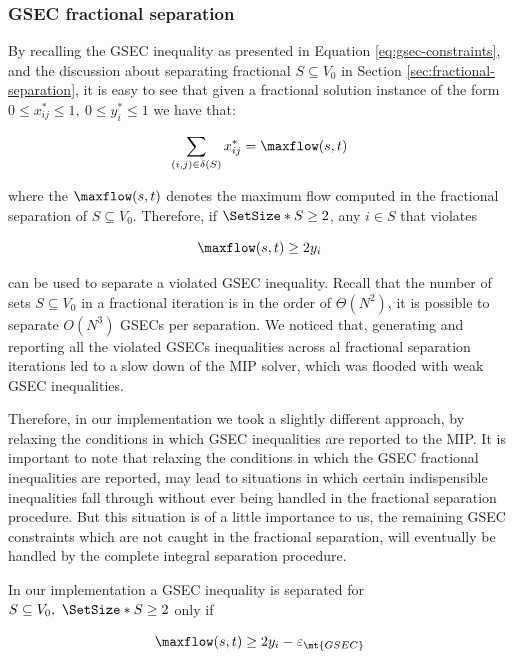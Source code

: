 \subsubsection{GSEC fractional separation}
\label{sec:impl-gsec-fractional-separation}

By recalling the GSEC inequality as presented in Equation \eqref{eq:gsec-constraints}, and the discussion about separating fractional $S \subseteq V_0$ in Section \ref{sec:fractional-separation}, it is easy to see that given a fractional solution instance of the form $0 \le x^*_{ij} \le 1,\ 0 \le y^*_{i} \le 1$ we have that:

\begin{equation}
	\sum_{(i, j) \in \delta(S)} x^*_{ij} = \maxflow(s, t)
\end{equation}

where the $\maxflow(s, t)$ denotes the maximum flow computed in the fractional separation of $S \subseteq V_0$.
Therefore, if $\SetSize*{S} \ge 2$, any $i \in S$ that violates

\begin{equation}
	\maxflow(s, t) \ge 2 y_i
\end{equation}

can be used to separate a violated GSEC inequality.
Recall that the number of sets $S \subseteq V_0$ in a fractional iteration is in the order of $\Theta(N^2)$, it is possible to separate $O(N^3)$ GSECs per separation.
We noticed that, generating and reporting all the violated GSECs inequalities across al fractional separation iterations led to a slow down of the MIP solver, which was flooded with weak GSEC inequalities.

Therefore, in our implementation we took a slightly different approach, by relaxing the conditions in which GSEC inequalities are reported to the MIP.
It is important to note that relaxing the conditions in which the GSEC fractional inequalities are reported, may lead to situations in which certain indispensible inequalities fall through without ever being handled in the fractional separation procedure.
But this situation is of a little importance to us, the remaining GSEC constraints which are not caught in the fractional separation, will eventually be handled by the complete integral separation procedure.

In our implementation a GSEC inequality is separated for $S \subseteq V_0,\ \SetSize*{S} \ge 2$ only if

\begin{equation}
	\maxflow(s, t) \ge 2 y_i - \varepsilon_{\mt{GSEC}}
\end{equation}

